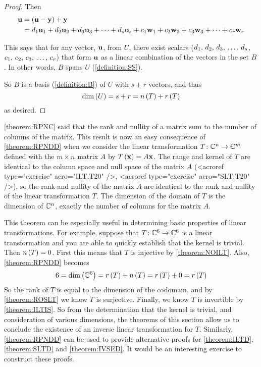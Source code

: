 \documentclass{ximera}
\begin{document}
\begin{theorem}
\begin{proof}
Then
\begin{align*}
\mathbf{u}&=\left(\mathbf{u}-\mathbf{y}\right)+\mathbf{y}\\
&=d_{1}\mathbf{u}_{1}+d_{2}\mathbf{u}_{2}+d_{3}\mathbf{u}_{3}+\cdots +d_{s}\mathbf{u}_{s}+c_{1}\mathbf{w}_{1}+c_{2}\mathbf{w}_{2}+c_{3}\mathbf{w}_{3}+\cdots +c_{r}\mathbf{w}_{r}
\end{align*}




This says that for any vector, $\mathbf{u}$, from $U$, there exist scalars (${d}_{1},\,{d}_{2},\,{d}_{3},\,\ldots,\,{d}_{s}$, ${c}_{1},\,{c}_{2},\,{c}_{3},\,\ldots,\,{c}_{r}$) that form $\mathbf{u}$ as a linear combination of the vectors in the set $B$.  In other words, $B$ spans $U$ (\ref{definition:SS}).



So $B$ is a basis (\ref{definition:B}) of $U$ with $s+r$ vectors, and thus
\[
\dim\left(U\right)=s+r=n\left(T\right)+r\left(T\right)
\]
as desired.



\end{proof}
\end{theorem}

\ref{theorem:RPNC} said that the rank and nullity of a matrix sum to the number of columns of the matrix.  This result is now an easy consequence of \ref{theorem:RPNDD} when we consider the linear transformation $T\colon \mathbb{C}^{n}\rightarrow\mathbb{C}^{m}$ defined with the $m\times n$ matrix $A$ by $T\left(\mathbf{x}\right)=A\mathbf{x}$.  The range and kernel of $T$ are identical to the column space and null space of the matrix $A$ (<acroref type="exercise" acro="ILT.T20" />, <acroref type="exercise" acro="SLT.T20" />), so the rank and nullity of the matrix $A$ are identical to the rank and nullity of the linear transformation $T$.  The dimension of the domain of $T$ is the dimension of $\mathbb{C}^{n}$, exactly the number of columns for the matrix $A$.



This theorem can be especially useful in determining basic properties of linear transformations.  For example, suppose that $T\colon \mathbb{C}^{6}\rightarrow\mathbb{C}^{6}$ is a linear transformation and you are able to quickly establish that the kernel is trivial.  Then $n\left(T\right)=0$.  First this means that $T$ is injective by \ref{theorem:NOILT}.  Also, \ref{theorem:RPNDD} becomes
\[
6=\dim\left(\mathbb{C}^{6}\right)=r\left(T\right)+n\left(T\right)=r\left(T\right)+0=r\left(T\right)
\]
So the rank of $T$ is equal to the dimension of the codomain, and by \ref{theorem:ROSLT} we know $T$ is surjective.  Finally, we know $T$ is invertible by \ref{theorem:ILTIS}.  So from the determination that the kernel is trivial, and consideration of various dimensions, the theorems of this section allow us to conclude the existence of an inverse linear transformation for $T$.
Similarly, \ref{theorem:RPNDD} can be used to provide alternative proofs for \ref{theorem:ILTD}, \ref{theorem:SLTD} and \ref{theorem:IVSED}.  It would be an interesting exercise to construct these proofs.
\end{document}

